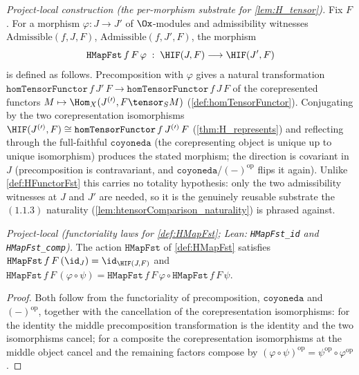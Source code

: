\begin{definition}

  \label{def:HMapFst}
  \textit{Project-local construction (the per-morphism substrate for \cref{lem:H_tensor}).}
  Fix $F$. For a morphism $\varphi : J \to J'$ of $\Ox$-modules and admissibility
  witnesses $\mathrm{Admissible}(f,J,F)$, $\mathrm{Admissible}(f,J',F)$, the morphism
  \[
    \mathtt{HMapFst}\,f\,F\,\varphi \;:\; \HIF(J,F) \longrightarrow \HIF(J',F)
  \]
  is defined as follows. Precomposition with $\varphi$ gives a natural transformation
  $\mathtt{homTensorFunctor}\,f\,J'\,F \to \mathtt{homTensorFunctor}\,f\,J\,F$ of the
  corepresented functors $M \mapsto \Hom_X(J^{(\prime)}, F \tensor_S M)$
  (\cref{def:homTensorFunctor}). Conjugating by the two corepresentation isomorphisms
  $\HIF(J^{(\prime)},F) \cong \mathtt{homTensorFunctor}\,f\,J^{(\prime)}\,F$
  (\cref{thm:H_represents}) and reflecting through the full-faithful
  $\mathtt{coyoneda}$ (the corepresenting object is unique up to unique isomorphism)
  produces the stated morphism; the direction is covariant in $J$ (precomposition is
  contravariant, and $\mathtt{coyoneda}$/$(-)^{\mathrm{op}}$ flips it again). Unlike
  \cref{def:HFunctorFst} this carries no totality hypothesis: only the two admissibility
  witnesses at $J$ and $J'$ are needed, so it is the genuinely reusable substrate the
  $(1.1.3)$ naturality (\cref{lem:htensorComparison_naturality}) is phrased against.
\end{definition}

\begin{lemma}
  \label{lem:HMapFst_functorial}
  \textit{Project-local (functoriality laws for \cref{def:HMapFst};
  Lean: \texttt{HMapFst\_id} and \texttt{HMapFst\_comp}).}
  The action $\mathtt{HMapFst}$ of \cref{def:HMapFst} satisfies
  $\mathtt{HMapFst}\,f\,F\,(\id_J) = \id_{\HIF(J,F)}$ and
  $\mathtt{HMapFst}\,f\,F\,(\varphi \circ \psi)
    = \mathtt{HMapFst}\,f\,F\,\varphi \circ \mathtt{HMapFst}\,f\,F\,\psi$.
  \begin{proof}
    Both follow from the functoriality of precomposition, $\mathtt{coyoneda}$ and
    $(-)^{\mathrm{op}}$, together with the cancellation of the corepresentation
    isomorphisms: for the identity the middle precomposition transformation is the
    identity and the two isomorphisms cancel; for a composite the corepresentation
    isomorphisms at the middle object cancel and the remaining factors compose by
    $(\varphi \circ \psi)^{\mathrm{op}} = \psi^{\mathrm{op}} \circ \varphi^{\mathrm{op}}$.
  \end{proof}
\end{lemma}

